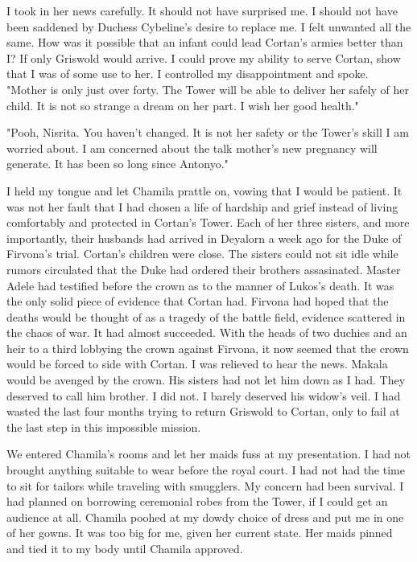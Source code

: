 \documentclass{article}
\begin{document}
I took in her news carefully. It should not have surprised me. I should not have been saddened by Duchess Cybeline's desire to replace me. I felt unwanted all the same. How was it possible that an infant could lead Cortan's armies better than I? If only Griswold would arrive. I could prove my ability to serve Cortan, show that I was of some use to her. I controlled my disappointment and spoke. "Mother is only just over forty. The Tower will be able to deliver her safely of her child. It is not so strange a dream on her part. I wish her good health."

"Pooh, Nisrita. You haven't changed. It is not her safety or the Tower's skill I am worried about. I am concerned about the talk mother's new pregnancy will generate. It has been so long since Antonyo."

I held my tongue and let Chamila prattle on, vowing that I would be patient. It was not her fault that I had chosen a life of hardship and grief instead of living comfortably and protected in Cortan's Tower. Each of her three sisters, and more importantly, their husbands had arrived in Deyalorn a week ago for the Duke of Firvona's trial. Cortan's children were close. The sisters could not sit idle while rumors circulated that the Duke had ordered their brothers assasinated. Master Adele had testified before the crown as to the manner of Lukos's death. It was the only solid piece of evidence that Cortan had. Firvona had hoped that the deaths would be thought of as a tragedy of the battle field, evidence scattered in the chaos of war. It had almost succeeded. With the heads of two duchies and an heir to a third lobbying the crown against Firvona, it now seemed that the crown would be forced to side with Cortan. 
I was relieved to hear the news. Makala would be avenged by the crown. His sisters had not let him down as I had. They deserved to call him brother. I did not. I barely deserved his widow's veil. I had wasted the last four months trying to return Griswold to Cortan, only to fail at the last step in this impossible mission.

We entered Chamila's rooms and let her maids fuss at my presentation. I had not brought anything suitable to wear before the royal court. I had not had the time to sit for tailors while traveling with smugglers. My concern had been survival. I had planned on borrowing ceremonial robes from the Tower, if I could get an audience at all. Chamila poohed at my dowdy choice of dress and put me in one of her gowns. It was too big for me, given her current state. Her maids pinned and tied it to my body until Chamila approved. 
\end{document}
